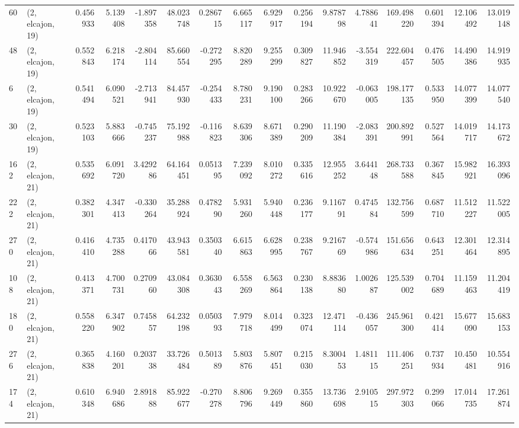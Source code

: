 \begin{tabular}{llrrrrrrrrrrrrrr}
60  &  (2, elcajon, 19) &   0.456933 &   5.139408 &  -1.897358 &    48.023748 &   0.286715 &   6.665117 &   6.929917 &  0.256194 &   9.878798 &   4.788641 &   169.498220 &  0.601394 &  12.106492 &  13.019148 \\
48  &  (2, elcajon, 19) &   0.552843 &   6.218174 &  -2.804114 &    85.660554 &  -0.272295 &   8.820289 &   9.255299 &  0.309827 &  11.946852 &  -3.554319 &   222.604457 &  0.476505 &  14.490386 &  14.919935 \\
6   &  (2, elcajon, 19) &   0.541494 &   6.090521 &  -2.713941 &    84.457930 &  -0.254433 &   8.780231 &   9.190100 &  0.283266 &  10.922670 &  -0.063005 &   198.177135 &  0.533950 &  14.077399 &  14.077540 \\
30  &  (2, elcajon, 19) &   0.523103 &   5.883666 &  -0.745237 &    75.192988 &  -0.116823 &   8.639306 &   8.671389 &  0.290209 &  11.190384 &  -2.083391 &   200.892991 &  0.527564 &  14.019717 &  14.173672 \\
162 &  (2, elcajon, 21) &   0.535692 &   6.091720 &   3.429286 &    64.164451 &   0.051395 &   7.239092 &   8.010272 &  0.335616 &  12.955252 &   3.644148 &   268.733588 &  0.367845 &  15.982921 &  16.393096 \\
222 &  (2, elcajon, 21) &   0.382301 &   4.347413 &  -0.330264 &    35.288924 &   0.478290 &   5.931260 &   5.940448 &  0.236177 &   9.116791 &   0.474584 &   132.756599 &  0.687710 &  11.512227 &  11.522005 \\
270 &  (2, elcajon, 21) &   0.416410 &   4.735288 &   0.417066 &    43.943581 &   0.350340 &   6.615863 &   6.628995 &  0.238767 &   9.216769 &  -0.574986 &   151.656634 &  0.643251 &  12.301464 &  12.314895 \\
108 &  (2, elcajon, 21) &   0.413371 &   4.700731 &   0.270960 &    43.084308 &   0.363043 &   6.558269 &   6.563864 &  0.230138 &   8.883680 &   1.002687 &   125.539002 &  0.704689 &  11.159463 &  11.204419 \\
180 &  (2, elcajon, 21) &   0.558220 &   6.347902 &   0.745857 &    64.232198 &   0.050393 &   7.979718 &   8.014499 &  0.323074 &  12.471114 &  -0.436057 &   245.961300 &  0.421414 &  15.677090 &  15.683153 \\
276 &  (2, elcajon, 21) &   0.365838 &   4.160201 &   0.203738 &    33.726484 &   0.501389 &   5.803876 &   5.807451 &  0.215030 &   8.300453 &   1.481115 &   111.406251 &  0.737934 &  10.450481 &  10.554916 \\
174 &  (2, elcajon, 21) &   0.610348 &   6.940686 &   2.891888 &    85.922677 &  -0.270278 &   8.806796 &   9.269449 &  0.355860 &  13.736698 &   2.910515 &   297.972303 &  0.299066 &  17.014735 &  17.261874 \\

\end{tabular}
